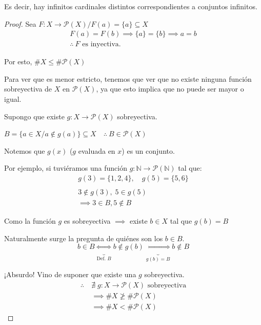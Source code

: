 Es decir, hay infinitos cardinales distintos correspondientes a conjuntos
infinitos.

\begin{proof} \phantom{.}

    Sea $F: X \to \mathcal{P}(X) / F(a) = \{a\} \subseteq X$
    \begin{gather*}
        F(a) = F(b) \implies \{a\} = \{b\} \implies a = b \\
        \therefore ~ F\text{ es inyectiva.}
    \end{gather*}

    Por esto, $\# X \leq \# \mathcal{P}(X)$

    Para ver que es menor estricto, tenemos que ver que no existe ninguna 
    función sobreyectiva de $X$ en $\mathcal{P}(X)$, ya que esto implica
    que no puede ser mayor o igual.

    Supongo que existe $g: X \to \mathcal{P}(X)$ sobreyectiva.

    $B = \{ a \in X / a \notin g(a) \} \subseteq X
    \quad \therefore ~ B \in \mathcal{P}(X)$ 

    \medskip
    Notemos que $g(x)$ ($g$ evaluada en $x$) es un conjunto.

    Por ejemplo, si tuviéramos una función
    $g: \mathbb{N} \to \mathcal{P}(\mathbb{N})$ tal que:
    \begin{gather*}
    g(3) = \{1,2,4\}, \quad g(5) = \{5,6\} \\
    \\
    3 \notin g(3), \; 5 \in g(5) \\ \implies 3 \in B, 5 \notin B
    \end{gather*}

    \medskip

    Como la función $g$ es sobreyectiva $\implies$ existe $b \in X$ tal que
    $g(b) = B$

    Naturalmente surge la pregunta de quiénes son los $b \in B$.
    \[ b \in B \underbrace{\iff }_{\text{Def. } B} b \notin g(b) 
        \underbrace{\iff}_{g(b)=B} b \notin B \]

    ¡Absurdo! Vino de suponer que existe una $g$ sobreyectiva.
    \begin{align*} 
        \therefore ~ &\nexists \; g:X \to\mathcal{P}(X) \text{ sobreyectiva}\\
        &\implies \# X \not\geq \# \mathcal{P}(X) \\
        &\implies \# X < \# \mathcal{P}(X)
    \end{align*}
\end{proof}

